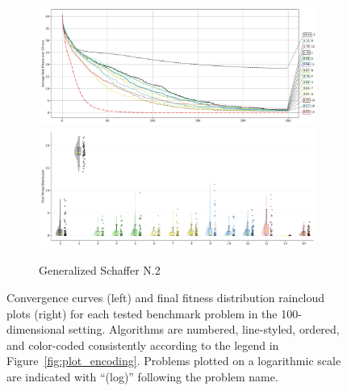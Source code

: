 \begin{figure}[p]
\begin{subfigure}{1\textwidth}
    \centering
    \includegraphics[width=.49\textwidth]{Figures/results/100/Generalized_Schaffer_N2_All_selected_algorithms_dim100_annot_legend.png}
    \includegraphics[width=.49\textwidth]{Figures/results/100/Generalized_Schaffer_N2_all_dim100_raincloud_vertical.png}
    \caption{Generalized Schaffer N.2}
\end{subfigure}

            \captionsetup{list=no}
\caption[Convergence curves and final fitness distribution raincloud plots for 100-dimensional problems]{Convergence curves (left) and final fitness distribution raincloud plots (right) for each tested benchmark problem in the 100-dimensional setting. Algorithms are numbered, line-styled, ordered, and color-coded consistently according to the legend in Figure~\ref{fig:plot_encoding}. Problems plotted on a logarithmic scale are indicated with ``(log)'' following the problem name.}

\end{figure}








